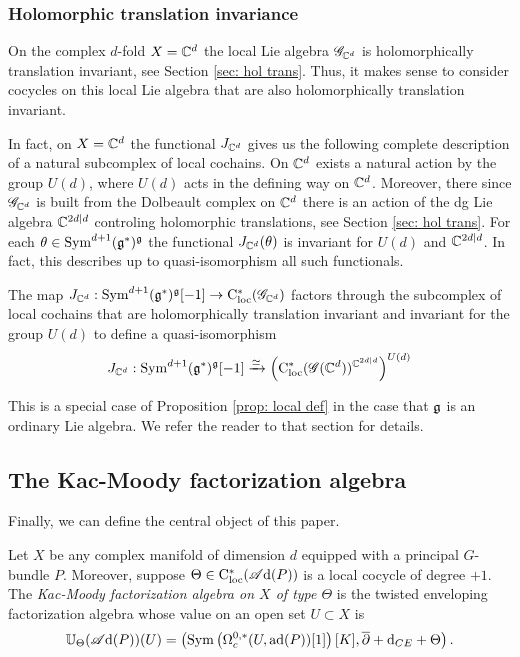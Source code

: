 \documentclass[10pt]{amsart}
\def\sAd{\sA{\rm d}}
\begin{document}
\subsubsection{Holomorphic translation invariance}

On the complex $d$-fold $X = \mathbb C^d$ the local Lie algebra $\mathscr G_{\mathbb C^d}$ is holomorphically translation invariant, see Section \ref{sec: hol trans}.
Thus, it makes sense to consider cocycles on this local Lie algebra that are also holomorphically translation invariant.

In fact, on $X=\mathbb C^d$ the functional $J_{\mathbb C^d}$ gives us the following complete description of a natural subcomplex of local cochains.
On $\mathbb C^d$ exists a natural action by the group $U(d)$, where $U(d)$ acts in the defining way on $\mathbb C^d$.
Moreover, there since $\mathscr G_{\mathbb C^d}$ is built from the Dolbeault complex on $\mathbb C^d$ there is an action of the dg Lie algebra $\mathbb C^{2d|d}$ controling holomorphic translations, see Section \ref{sec: hol trans}. 
For each $\theta \in {\rm Sym}^{d+1}(\mathfrak g^*)^\mathfrak g$ the functional $J_{\mathbb C^d}(\theta)$ is invariant for $U(d)$ and $\mathbb C^{2d|d}$.
In fact, this describes up to quasi-isomorphism all such functionals.

\begin{prop}
The map $J_{\mathbb C^d} :  {\rm Sym}^{d+1}(\mathfrak g^*)^\mathfrak g [-1] \to {\rm C}_{\rm loc}^*(\mathscr G_{\mathbb C^d})$ factors through the subcomplex of local cochains that are holomorphically translation invariant and invariant for the group $U(d)$ to define a quasi-isomorphism
\[
J_{\mathbb C^d} : {\rm Sym}^{d+1}(\mathfrak g^*)^\mathfrak g [-1] \xrightarrow{\simeq} \left({\rm C}_{\rm loc}^*(\mathscr G({\mathbb C^d}))^{\mathbb C^{2d|d}}\right)^{U(d)}
\]
\end{prop}

This is a special case of Proposition \ref{prop: local def} in the case that $\mathfrak g$ is an ordinary Lie algebra.  
We refer the reader to that section for details.

\subsection{The Kac-Moody factorization algebra}

Finally, we can define the central object of this paper.

\begin{dfn}
Let $X$ be any complex manifold of dimension $d$ equipped with a principal $G$-bundle $P$.
Moreover, suppose $\Theta \in \cloc^*(\sAd(P))$ is a local cocycle of degree $+1$. 
The {\em Kac-Moody factorization algebra on $X$ of type $\Theta$} is the twisted enveloping factorization algebra whose value on an open set $U \subset X$ is
\[
\UU_\Theta (\sAd(P))(U) = \left(\Sym\left(\Omega^{0,*}_c(U, \ad(P))[1]\right) [K] , \dbar + \d_{CE} + \Theta\right) .
\]
\end{dfn}
\end{document}
